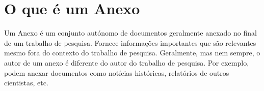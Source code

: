 \chapter{O que é um Anexo}

Um Anexo é um conjunto autónomo de documentos geralmente anexado no final de um trabalho de pesquisa. Fornece informações importantes que são relevantes mesmo fora do contexto do trabalho de pesquisa. Geralmente, mas nem sempre, o autor de um anexo é diferente do autor do trabalho de pesquisa. Por exemplo, podem anexar documentos como notícias históricas, relatórios de outros cientistas, etc.